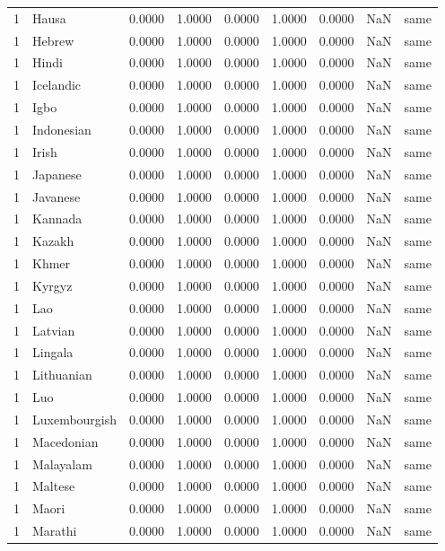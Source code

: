 \begin{tabular}{rlrrrrrrl}
1 & Hausa & 0.0000 & 1.0000 & 0.0000 & 1.0000 & 0.0000 & NaN & same \\
1 & Hebrew & 0.0000 & 1.0000 & 0.0000 & 1.0000 & 0.0000 & NaN & same \\
1 & Hindi & 0.0000 & 1.0000 & 0.0000 & 1.0000 & 0.0000 & NaN & same \\
1 & Icelandic & 0.0000 & 1.0000 & 0.0000 & 1.0000 & 0.0000 & NaN & same \\
1 & Igbo & 0.0000 & 1.0000 & 0.0000 & 1.0000 & 0.0000 & NaN & same \\
1 & Indonesian & 0.0000 & 1.0000 & 0.0000 & 1.0000 & 0.0000 & NaN & same \\
1 & Irish & 0.0000 & 1.0000 & 0.0000 & 1.0000 & 0.0000 & NaN & same \\
1 & Japanese & 0.0000 & 1.0000 & 0.0000 & 1.0000 & 0.0000 & NaN & same \\
1 & Javanese & 0.0000 & 1.0000 & 0.0000 & 1.0000 & 0.0000 & NaN & same \\
1 & Kannada & 0.0000 & 1.0000 & 0.0000 & 1.0000 & 0.0000 & NaN & same \\
1 & Kazakh & 0.0000 & 1.0000 & 0.0000 & 1.0000 & 0.0000 & NaN & same \\
1 & Khmer & 0.0000 & 1.0000 & 0.0000 & 1.0000 & 0.0000 & NaN & same \\
1 & Kyrgyz & 0.0000 & 1.0000 & 0.0000 & 1.0000 & 0.0000 & NaN & same \\
1 & Lao & 0.0000 & 1.0000 & 0.0000 & 1.0000 & 0.0000 & NaN & same \\
1 & Latvian & 0.0000 & 1.0000 & 0.0000 & 1.0000 & 0.0000 & NaN & same \\
1 & Lingala & 0.0000 & 1.0000 & 0.0000 & 1.0000 & 0.0000 & NaN & same \\
1 & Lithuanian & 0.0000 & 1.0000 & 0.0000 & 1.0000 & 0.0000 & NaN & same \\
1 & Luo & 0.0000 & 1.0000 & 0.0000 & 1.0000 & 0.0000 & NaN & same \\
1 & Luxembourgish & 0.0000 & 1.0000 & 0.0000 & 1.0000 & 0.0000 & NaN & same \\
1 & Macedonian & 0.0000 & 1.0000 & 0.0000 & 1.0000 & 0.0000 & NaN & same \\
1 & Malayalam & 0.0000 & 1.0000 & 0.0000 & 1.0000 & 0.0000 & NaN & same \\
1 & Maltese & 0.0000 & 1.0000 & 0.0000 & 1.0000 & 0.0000 & NaN & same \\
1 & Maori & 0.0000 & 1.0000 & 0.0000 & 1.0000 & 0.0000 & NaN & same \\
1 & Marathi & 0.0000 & 1.0000 & 0.0000 & 1.0000 & 0.0000 & NaN & same \\

\end{tabular}
